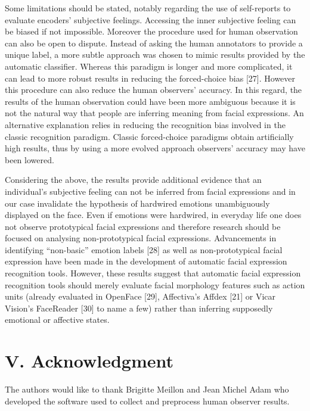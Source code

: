 \documentclass[conference,final,]{IEEEtran}
\begin{document}
Some limitations should be stated, notably regarding the use of
self-reports to evaluate encoders' subjective feelings. Accessing the
inner subjective feeling can be biased if not impossible. Moreover the
procedure used for human observation can also be open to dispute.
Instead of asking the human annotators to provide a unique label, a more
subtle approach was chosen to mimic results provided by the automatic
classifier. Whereas this paradigm is longer and more complicated, it can
lead to more robust results in reducing the forced-choice bias {[}27{]}.
However this procedure can also reduce the human observers' accuracy. In
this regard, the results of the human observation could have been more
ambiguous because it is not the natural way that people are inferring
meaning from facial expressions. An alternative explanation relies in
reducing the recognition bias involved in the classic recognition
paradigm. Classic forced-choice paradigms obtain artificially high
results, thus by using a more evolved approach observers' accuracy may
have been lowered.

Considering the above, the results provide additional evidence that an
individual's subjective feeling can not be inferred from facial
expressions and in our case invalidate the hypothesis of hardwired
emotions unambiguously displayed on the face. Even if emotions were
hardwired, in everyday life one does not observe prototypical facial
expressions and therefore research should be focused on analysing
non-prototypical facial expressions. Advancements in identifying
``non-basic'' emotion labels {[}28{]} as well as non-prototypical facial
expression have been made in the development of automatic facial
expression recognition tools. However, these results suggest that
automatic facial expression recognition tools should merely evaluate
facial morphology features such as action units (already evaluated in
OpenFace {[}29{]}, Affectiva's Affdex {[}21{]} or Vicar Vision's
FaceReader {[}30{]} to name a few) rather than inferring supposedly
emotional or affective states.

\hypertarget{acknowledgment}{%
\section{V. Acknowledgment}\label{acknowledgment}}

The authors would like to thank Brigitte Meillon and Jean Michel Adam
who developed the software used to collect and preprocess human observer
results.
\end{document}
